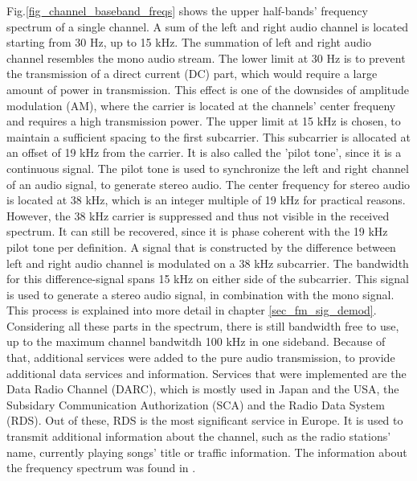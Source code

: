 \documentclass[conference]{IEEEtran}
\begin{document}
    Fig.\ref{fig_channel_baseband_freqs} shows the upper half-bands' frequency spectrum of a single channel.
    A sum of the left and right audio channel is located starting from 30 Hz, up to 15 kHz.
    The summation of left and right audio channel resembles the mono audio stream.
    The lower limit at 30 Hz is to prevent the transmission of a direct current (DC) part, which would require a large amount of power in transmission. This effect is one of the downsides of amplitude modulation (AM), where the carrier is located at the channels' center frequeny and requires a high transmission power. %
    The upper limit at 15 kHz is chosen, to maintain a sufficient spacing to the first subcarrier.
    This subcarrier is allocated at an offset of 19 kHz from the carrier.
    It is also called the 'pilot tone', since it is a continuous signal.
    The pilot tone is used to synchronize the left and right channel of an audio signal, to generate stereo audio.
    The center frequency for stereo audio is located at 38 kHz, which is an integer multiple of 19 kHz for practical reasons.
    However, the 38 kHz carrier is suppressed and thus not visible in the received spectrum.
    It can still be recovered, since it is phase coherent with the 19 kHz pilot tone per definition.
    A signal that is constructed by the difference between left and right audio channel is modulated on a 38 kHz subcarrier.
    The bandwidth for this difference-signal spans 15 kHz on either side of the subcarrier.
    This signal is used to generate a stereo audio signal, in combination with the mono signal.
    This process is explained into more detail in chapter \ref{sec_fm_sig_demod}.
    Considering all these parts in the spectrum, there is still bandwidth free to use, up to the maximum channel bandwitdh 100 kHz in one sideband.
    Because of that, additional services were added to the pure audio transmission, to provide additional data services and information.
    Services that were implemented are the Data Radio Channel (DARC), which is mostly used in Japan and the USA, the Subsidary Communication Authorization (SCA) and the Radio Data System (RDS).
    Out of these, RDS is the most significant service in Europe.
    It is used to transmit additional information about the channel, such as the radio stations' name, currently playing songs' title or traffic information.
    The information about the frequency spectrum was found in \cite{fm_broadcast_tutorial_and_basics}.
\end{document}
